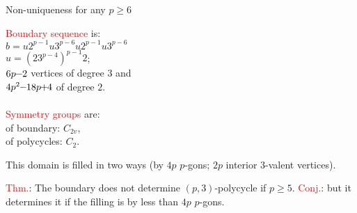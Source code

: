 \documentclass[%
pdf,
colorBG,
slideColor,
]{prosper}
\begin{document}
\begin{slide}{Non-uniqueness for any $p\geq 6$}

\vspace{-3.5mm}
\begin{center}
\begin{minipage}{53mm}
\centering
{}\par
\end{minipage}
\begin{minipage}{58mm}
\textcolor{red}{Boundary sequence} is:\\
$b=u2^{p-1}u3^{p-6}u2^{p-1}u3^{p-6}$\\
$u=(23^{p-4})^{p-1}2$;\\
$6p\hspace{-1mm}-\hspace{-1mm}2$ vertices of degree $3$ and\\
$4p^2\hspace{-1mm}-\hspace{-1mm}18p\hspace{-1mm}+\hspace{-1mm}4$ of degree $2$.\\
\\
\textcolor{red}{Symmetry groups} are:\\
of boundary: $C_{2v}$,\\
of polycycles: $C_2$.
\end{minipage}

\end{center}
This domain is filled in two ways (by $4p$ $p$-gons; $2p$ interior $3$-valent vertices).

\textcolor{red}{Thm.}: The boundary does not determine $(p,3)$-polycycle if $p\geq 5$.
\textcolor{red}{Conj.}: but it determines it if the filling is by less than $4p$ $p$-gons.



\end{slide}
\end{document}
